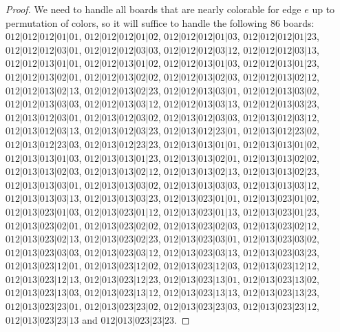 \documentclass[12pt]{article}
\begin{document}
\begin{proof}
We need to handle all boards that are nearly colorable for edge $e$ up to permutation of colors, so it will suffice to handle the following 86 boards: $012|012|012|01|01$, $012|012|012|01|02$, $012|012|012|01|03$, $012|012|012|01|23$, $012|012|012|03|01$, $012|012|012|03|03$, $012|012|012|03|12$, $012|012|012|03|13$, $012|012|013|01|01$, $012|012|013|01|02$, $012|012|013|01|03$, $012|012|013|01|23$, $012|012|013|02|01$, $012|012|013|02|02$, $012|012|013|02|03$, $012|012|013|02|12$, $012|012|013|02|13$, $012|012|013|02|23$, $012|012|013|03|01$, $012|012|013|03|02$, $012|012|013|03|03$, $012|012|013|03|12$, $012|012|013|03|13$, $012|012|013|03|23$, $012|013|012|03|01$, $012|013|012|03|02$, $012|013|012|03|03$, $012|013|012|03|12$, $012|013|012|03|13$, $012|013|012|03|23$, $012|013|012|23|01$, $012|013|012|23|02$, $012|013|012|23|03$, $012|013|012|23|23$, $012|013|013|01|01$, $012|013|013|01|02$, $012|013|013|01|03$, $012|013|013|01|23$, $012|013|013|02|01$, $012|013|013|02|02$, $012|013|013|02|03$, $012|013|013|02|12$, $012|013|013|02|13$, $012|013|013|02|23$, $012|013|013|03|01$, $012|013|013|03|02$, $012|013|013|03|03$, $012|013|013|03|12$, $012|013|013|03|13$, $012|013|013|03|23$, $012|013|023|01|01$, $012|013|023|01|02$, $012|013|023|01|03$, $012|013|023|01|12$, $012|013|023|01|13$, $012|013|023|01|23$, $012|013|023|02|01$, $012|013|023|02|02$, $012|013|023|02|03$, $012|013|023|02|12$, $012|013|023|02|13$, $012|013|023|02|23$, $012|013|023|03|01$, $012|013|023|03|02$, $012|013|023|03|03$, $012|013|023|03|12$, $012|013|023|03|13$, $012|013|023|03|23$, $012|013|023|12|01$, $012|013|023|12|02$, $012|013|023|12|03$, $012|013|023|12|12$, $012|013|023|12|13$, $012|013|023|12|23$, $012|013|023|13|01$, $012|013|023|13|02$, $012|013|023|13|03$, $012|013|023|13|12$, $012|013|023|13|13$, $012|013|023|13|23$, $012|013|023|23|01$, $012|013|023|23|02$, $012|013|023|23|03$, $012|013|023|23|12$, $012|013|023|23|13$ and $012|013|023|23|23$.



\end{proof}
\end{document}
